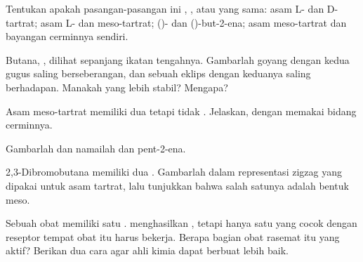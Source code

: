 \begin{exercise}[$\star\star$]\label{exo:g12:stereochemistry:8}
Tentukan apakah pasangan-pasangan ini , , atau
 yang sama: asam L- dan D-tartrat; asam L- dan meso-tartrat;
()- dan ()-but-2-ena; asam meso-tartrat dan bayangan cerminnya
sendiri.
\end{exercise}

\begin{exercise}[$\star\star$]\label{exo:g12:stereochemistry:9}
Butana, , dilihat sepanjang ikatan tengahnya.
Gambarlah  goyang dengan kedua gugus  saling
berseberangan, dan sebuah  eklips dengan keduanya saling
berhadapan. Manakah yang lebih stabil? Mengapa?
\end{exercise}

\begin{exercise}[$\star\star$]\label{exo:g12:stereochemistry:10}
Asam meso-tartrat memiliki dua  tetapi tidak .
Jelaskan, dengan memakai bidang cerminnya.
\end{exercise}

\begin{exercise}[$\star\star$]\label{exo:g12:stereochemistry:11}
Gambarlah dan namailah  dan  pent-2-ena.
\end{exercise}

\begin{exercise}[$\star\star\star$]\label{exo:g12:stereochemistry:12}
2,3-Dibromobutana  memiliki dua .
Gambarlah  dalam representasi zigzag yang
dipakai untuk asam tartrat, lalu tunjukkan bahwa salah satunya adalah
bentuk meso.
\end{exercise}

\begin{exercise}[$\star\star\star$]\label{exo:g12:stereochemistry:13}
Sebuah  obat memiliki satu . 
menghasilkan , tetapi hanya satu  yang cocok
dengan reseptor  tempat obat itu harus bekerja. Berapa bagian obat
rasemat itu yang aktif? Berikan dua cara agar ahli kimia dapat berbuat
lebih baik.
\end{exercise}

